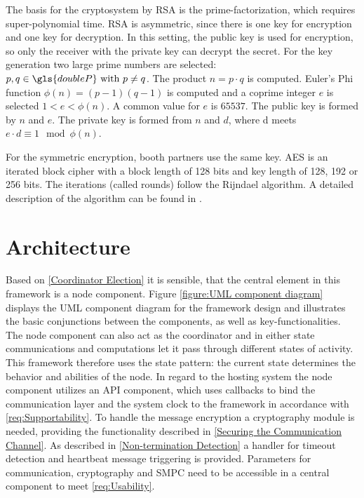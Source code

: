 The basis for the cryptosystem by \gls{RSA} is the prime-factorization, which requires super-polynomial time. \gls{RSA} is asymmetric, since there is one key for encryption and one key for decryption. In this setting, the public key is used for encryption, so only the receiver with the private key can decrypt the secret.
For the key generation two large prime numbers are selected: $p,q \in \gls{doubleP} \ \text{with} \ p\neq q$. The product $n=p\cdot q$ is computed. Euler's Phi function $\phi (n)=(p-1)(q-1)$ is computed and a coprime integer $e$ is selected $1<e<\phi(n)$. A common value for $e$ is $65537$. The public key is formed by $n$ and $e$.
The private key is formed from $n$ and $d$, where d meets $e\cdot d\equiv 1\mod \phi(n)$.

For the symmetric encryption, booth partners use the same key. \gls{AES} is an iterated block cipher with a block length of 128 bits and key length of 128, 192 or 256 bits. The iterations (called rounds) follow the Rijndael algorithm. A detailed description of the algorithm can be found in \textcite[pp. 20-25]{Delfs2015}.

\section{Architecture} \label{Architecture}

Based on \ref{Coordinator Election} it is sensible, that the central element in this framework is a node component. Figure \ref{figure:UML component diagram} displays the \gls{UML} component diagram for the framework design and illustrates the basic conjunctions between the components, as well as key-functionalities. The node component can also act as the coordinator and in either state communications and computations let it pass through different states of activity. This framework therefore uses the state pattern: the current state determines the behavior and abilities of the node.
In regard to the hosting system the node component utilizes an \gls{API} component, which uses callbacks to bind the communication layer and the system clock to the framework in accordance with \ref{req:Supportability}. To handle the message encryption a cryptography module is needed, providing the functionality described in \ref{Securing the Communication Channel}. As described in \ref{Non-termination Detection} a handler for timeout detection and heartbeat message triggering is provided. Parameters for communication, cryptography and \gls{SMPC} need to be accessible in a central component to meet \ref{req:Usability}.

